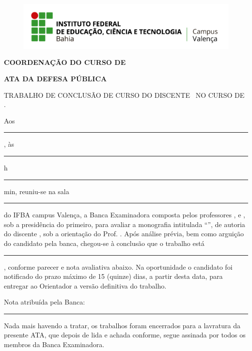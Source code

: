 \begin{center}
    \begin{figure}
        \centering
        \includegraphics[width=0.5\linewidth]{images/ifba_val_logo_hor.png}
    \end{figure}
    \begin{minipage}[!h]{0.80\textwidth}
        \centering
        \textbf{COORDENAÇÃO DO CURSO DE \MakeUppercase{\course}}
    \end{minipage}
\end{center}

\vspace*{1.2\baselineskip}
\begin{center}    
    \textbf{ATA DA DEFESA PÚBLICA}    
\end{center}
\vspace{2\baselineskip}

\noindent TRABALHO DE CONCLUSÃO DE CURSO DO DISCENTE \studentName\ NO CURSO DE \MakeUppercase{\course}.%
\vspace*{1.65\baselineskip}\par
%
Aos~\rule{10cm}{0.4pt}, às \rule{1cm}{0.4pt}h\ \rule{1cm}{0.4pt} min, reuniu-se na sala \rule{4cm}{0.4pt} do IFBA campus Valença, a Banca Examinadora composta pelos professores \MakeUppercase{\advisor}, \MakeUppercase{\membroBancaUm} e \MakeUppercase{\membroBancaDois}, sob a presidência do primeiro, para avaliar a monografia intitulada ``\MakeUppercase{\tccTitle}'', de autoria do discente \MakeUppercase{\studentName}, sob a orientação do Prof. \MakeUppercase{\advisor}. Após análise prévia, bem como arguição do candidato pela banca, chegou-se à conclusão que o trabalho está \rule{5cm}{0.4pt}, conforme parecer e nota avaliativa abaixo. Na oportunidade o candidato foi notificado do prazo máximo de 15 (quinze) dias, a partir desta data, para entregar ao Orientador a versão definitiva do trabalho.\par
%
\vspace*{2\baselineskip}
\noindent{}%
%
\newpage
\noindent Nota atribuída pela Banca: \rule{2.25cm}{0.4pt}\par
\noindent Nada mais havendo a tratar, os trabalhos foram encerrados para a lavratura da presente ATA, que depois de lida e achada conforme, segue assinada por todos os membros da Banca Examinadora.

